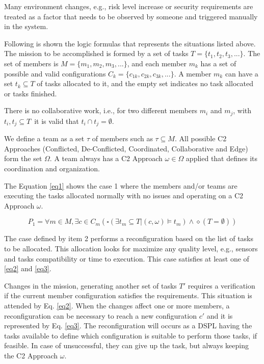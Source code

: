 Many environment changes, e.g., risk level increase or security requirements are treated as a factor that needs to be observed by someone and triggered manually in the system.

Following is shown the logic formulas that represents the situations listed above. The mission to be accomplished is formed by a set of tasks $T=\{t_1, t_2, t_3,...\}$. The set of members is $M = \{m_1, m_2, m_3,... \}$, and each member $m_k$ has a set of possible and valid configurations $C_k = \{c_{1k}, c_{2k}, c_{3k}, ... \}$. A member $m_k$ can have a set $t_k \subseteq T$ of tasks allocated to it, and the empty set indicates no task allocated or tasks finished.

There is no collaborative work, i.e., for two different members $m_i$ and $m_j$, with $t_i, t_j \subseteq T$\, it is valid that $t_i \cap t_j = \emptyset$.

We define a team as a set $\tau$ of members such as $\tau \subseteq M$. All possible C2 Approaches (Conflicted, De-Conflicted, Coordinated, Collaborative and Edge) form the set $\Omega$. A team always has a C2 Approach $\omega \in \Omega$ applied that defines its coordination and organization. 

The Equation \eqref{eq1} shows the case 1 where the members and/or teams are executing the tasks allocated normally with no issues and operating on a C2 Approach $\omega$.

\begin{equation}
\label{eq1}
 P_1 = \forall m \in M, \exists c \in C_m ( \square (\exists t_m \subseteq T | (c, \omega) \models t_m ) \land \diamond (T = \emptyset )) 
\end{equation}

The case defined by item 2 performs a reconfiguration based on the list of tasks to be allocated. This allocation looks for maximize any quality level, e.g., sensors and tasks compatibility or time to execution. This case satisfies at least one of \eqref{eq2} and \eqref{eq3}. 

Changes in the mission, generating another set of tasks $T'$ requires a verification if the current member configuration satisfies the requirements. This situation is attended by Eq. \eqref{eq2}. When the changes affect one or more members, a reconfiguration can be necessary to reach a new configuration $c'$ and it is represented by Eq. \eqref{eq3}. The reconfiguration will occurs as a DSPL having the tasks available to define which configuration is suitable to perform those tasks, if feasible. In case of unsuccessful, they can give up the task, but always keeping the C2 Approach $\omega$.

